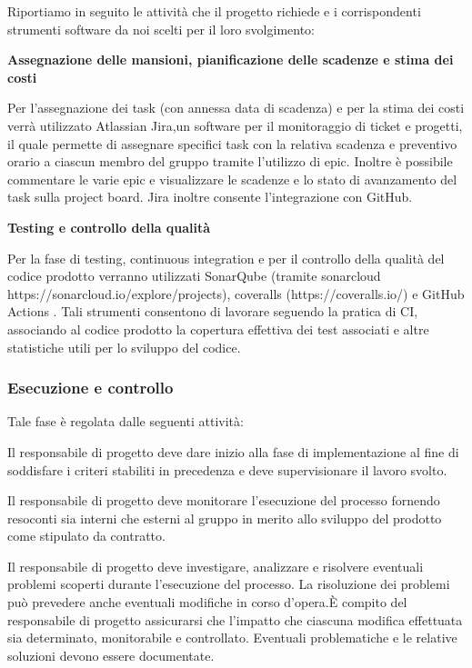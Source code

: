 Riportiamo in seguito le attività che il progetto richiede e i corrispondenti strumenti software da noi scelti per il loro svolgimento:

\textbf{Assegnazione delle mansioni, pianificazione delle scadenze e stima dei costi}

Per l'assegnazione dei task (con annessa data di scadenza) e per la stima dei costi verrà utilizzato  Atlassian Jira,un software per il monitoraggio di ticket e progetti, il quale permette di assegnare specifici task con la relativa scadenza e preventivo orario a ciascun membro del gruppo tramite l'utilizzo di epic. Inoltre è possibile commentare le varie epic e visualizzare le scadenze e lo stato di avanzamento del task sulla project board. Jira inoltre consente l'integrazione con GitHub.

\textbf{Testing e controllo della qualità}

Per la fase di testing, continuous integration e per il controllo della qualità del codice prodotto verranno utilizzati SonarQube (tramite sonarcloud https://sonarcloud.io/explore/projects), coveralls (https://coveralls.io/) e GitHub Actions . Tali strumenti consentono di lavorare seguendo la pratica di CI, associando al codice prodotto la copertura effettiva dei test associati e altre  statistiche utili per lo sviluppo del codice.



\subsubsection{Esecuzione e controllo}
Tale fase è regolata dalle seguenti attività:

\myparagraph{}
Il responsabile di progetto deve dare inizio alla fase di implementazione al fine di soddisfare i criteri stabiliti in precedenza e deve supervisionare il lavoro svolto.

\myparagraph{}
Il responsabile di progetto deve monitorare l'esecuzione del processo fornendo resoconti sia interni che esterni al gruppo in merito allo sviluppo del prodotto come stipulato da contratto.

\myparagraph{}
Il responsabile di progetto deve investigare, analizzare e risolvere eventuali problemi scoperti durante l'esecuzione del processo. La risoluzione dei problemi può prevedere anche eventuali modifiche in corso d'opera.\`E compito del responsabile di progetto assicurarsi che l'impatto che ciascuna modifica effettuata sia determinato, monitorabile e controllato. Eventuali problematiche e le relative soluzioni devono essere documentate.

